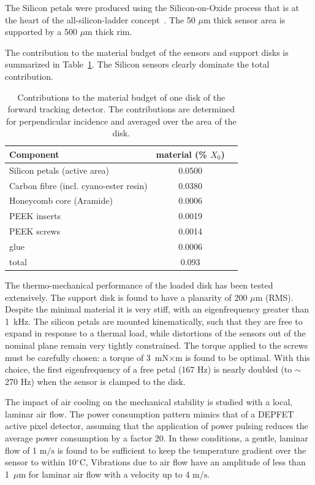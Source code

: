 The Silicon petals were produced using the Silicon-on-Oxide process that is at the heart of the
all-silicon-ladder concept~\cite{Andricek:2004cj}. The 50 $\mu \mathrm{m}$ thick sensor area is supported by a 500 $\mu \mathrm{m}$ thick rim.

The contribution to the material budget of the sensors and support disks is 
summarized in Table~\ref{tab:ftd_disk_material_budget}. The Silicon sensors clearly
dominate the total contribution.

\begin{table}[h]
    \centering
    \begin{tabular}{lcc}
    \toprule
    Component                      & material (\% $X_0$) \\ \midrule
    Silicon petals (active area)  &         0.0500 \\
    Carbon fibre (incl. cyano-ester resin)     &   0.0380 \\
    Honeycomb core (Aramide)      &   0.0006 \\
    PEEK inserts                  &   0.0019 \\
    PEEK screws                   &   0.0014 \\
    glue                          &   0.0006  \\ \midrule
    total                         &     0.093      \\ \bottomrule
    \end{tabular}
    \caption{Contributions to the material budget of one disk of the forward tracking detector. The contributions are determined for perpendicular incidence and averaged over the area
    of the disk.}
    \label{tab:ftd_disk_material_budget}
\end{table}

The thermo-mechanical performance of the loaded disk has been tested extensively. The 
support disk is found to have a planarity of 200 $\mu \mathrm{m}$ (RMS). Despite the 
minimal material it is very stiff, with an eigenfrequency greater than 1~kHz. The
silicon petals are mounted kinematically, such that they are free to expand in response
to a thermal load, while distortions of the sensors out of the nominal plane remain
very tightly constrained. The torque applied to the screws must be carefully
chosen: a torque of 3~mN$\times$m is found to be optimal. 
With this choice, the first eigenfrequency of a free petal (167 Hz) is nearly
doubled (to $\sim$ 270 Hz) when the sensor is clamped to the disk. 

The impact of air cooling on the mechanical stability is studied with a local, 
laminar air flow. The power consumption pattern mimics that of a DEPFET
active pixel detector, assuming that the application of power pulsing reduces
the average power consumption by a factor 20.
In these conditions, a gentle, laminar flow of 1 $\mathrm{m/s}$ is found to be sufficient
to keep the temperature gradient over the sensor to within 10$^{\circ}$C, 
Vibrations due to air flow have an  amplitude of less than 1~$\mu \mathrm{m}$ 
for laminar air flow with a velocity up to 4 $\mathrm{m/s}$. 

